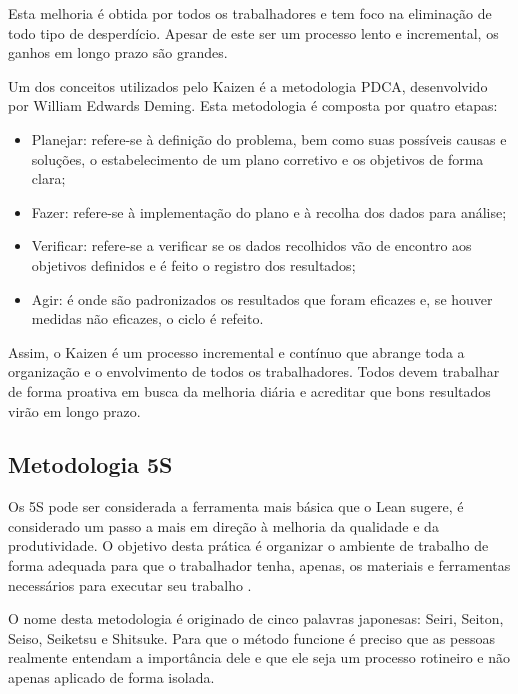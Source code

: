 \begin{anexosenv}
Esta melhoria é obtida por todos os trabalhadores e tem foco na eliminação de todo tipo de desperdício. Apesar de este ser um processo lento e incremental, os ganhos em longo prazo são grandes.

Um dos conceitos utilizados pelo Kaizen é a metodologia PDCA, desenvolvido por William Edwards Deming. Esta metodologia é composta por quatro etapas:
\begin{itemize}
\item Planejar: refere-se à definição do problema, bem como suas possíveis causas e soluções, o estabelecimento de um plano corretivo e os objetivos de forma clara;
\item Fazer: refere-se à implementação do plano e à recolha dos dados para análise;
\item Verificar: refere-se a verificar se os dados recolhidos vão de encontro aos objetivos definidos e é feito o registro dos resultados;
\item Agir:  é onde são padronizados os resultados que foram eficazes e, se houver medidas não eficazes, o ciclo é refeito.
\end{itemize}

Assim, o Kaizen é um processo incremental e contínuo que abrange toda a organização e o envolvimento de todos os trabalhadores. Todos devem trabalhar de forma proativa em busca da melhoria diária e acreditar que bons resultados virão em longo prazo.

\subsection[Metodologia 5S]{Metodologia 5S}

Os 5S pode ser considerada a ferramenta mais básica que o Lean sugere, é considerado um passo a mais em direção à melhoria da qualidade e da produtividade. O objetivo desta prática é organizar o ambiente de trabalho de forma adequada para que o trabalhador tenha, apenas, os materiais e ferramentas necessários para executar seu trabalho \cite{bell2011}. 

O nome desta metodologia é originado de cinco palavras japonesas: Seiri, Seiton, Seiso, Seiketsu e Shitsuke. Para que o método funcione é preciso que as pessoas realmente entendam a importância dele e que ele seja um processo rotineiro e não apenas aplicado de forma isolada.


\end{anexosenv}
